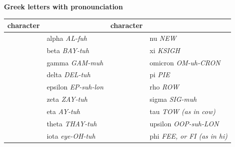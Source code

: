 \documentclass[
	fontsize=10pt,
	numbers=noenddot,
]{kaobook}
\begin{document}

\thispagestyle{empty}

\begin{center}
	\textbf{Greek letters with pronounciation}\\[1.5ex]
	\newcommand{\pronounced}[1]{\hspace*{.2em}\small\textit{#1}}
	\begin{tabular}{cl@{\hspace*{3em}}cl}
		character &\multicolumn{1}{c}{\makebox[-3.5em][r]{name}}       
		&character  &\multicolumn{1}{c}{\makebox[-3.5em][r]{name}}  \\ 
		\hline
		\makebox[1em][l]{\( \alpha  \)} &alpha \pronounced{AL-fuh}  
		&\makebox[1em][l]{\( \nu     \)}  &nu  \pronounced{NEW}       \\
		\makebox[1em][l]{\( \beta   \)} &beta  \pronounced{BAY-tuh}     
		&\makebox[1em][l]{\( \xi  \), \( \Xi \)}  &xi   \pronounced{KSIGH}    \\ 
		\makebox[1em][l]{\( \gamma  \), \( \Gamma \)} &gamma  \pronounced{GAM-muh}
		&\makebox[1em][l]{\( o \)} &omicron  \pronounced{OM-uh-CRON}  \\
		\makebox[1em][l]{\( \delta  \), \( \Delta \)} &delta  \pronounced{DEL-tuh} 
		&\makebox[1em][l]{\( \pi \), \( \Pi \)} &pi  \pronounced{PIE}     \\
		\makebox[1em][l]{\( \epsilon\)} &epsilon  \pronounced{EP-suh-lon}   
		&\makebox[1em][l]{\( \rho \)} &rho  \pronounced{ROW}    \\
		\makebox[1em][l]{\( \zeta   \)} &zeta   \pronounced{ZAY-tuh}    
		&\makebox[1em][l]{\( \sigma  \), \( \Sigma \)} &sigma  \pronounced{SIG-muh}  \\
		\makebox[1em][l]{\( \eta  \)} &eta  \pronounced{AY-tuh}      
		&\makebox[1em][l]{\( \tau \)} &tau  \pronounced{TOW (as in cow)}    \\
		\makebox[1em][l]{\( \theta \), \( \Theta \)} &theta  \pronounced{THAY-tuh}    
		&\makebox[1em][l]{\( \upsilon\), \( \Upsilon \)} &upsilon  \pronounced{OOP-suh-LON}  \\
		\makebox[1em][l]{\( \iota \)} &iota \pronounced{eye-OH-tuh}   
		&\makebox[1em][l]{\( \phi \), \( \Phi \)} &phi  \pronounced{FEE, or FI (as in hi)}    \\

\end{tabular}
\end{center}
\end{document}
